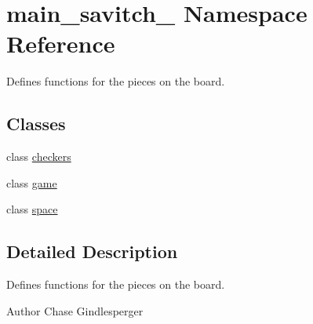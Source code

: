\hypertarget{namespacemain__savitch__14}{}\section{main\+\_\+savitch\+\_ Namespace Reference}
\label{namespacemain__savitch__14}


Defines functions for the pieces on the board.  


\subsection*{Classes}
\begin{DoxyCompactItemize}
\item 
class \hyperlink{classmain__savitch__14_1_1checkers}{checkers}
\item 
class \hyperlink{classmain__savitch__14_1_1game}{game}
\item 
class \hyperlink{classmain__savitch__14_1_1space}{space}
\end{DoxyCompactItemize}


\subsection{Detailed Description}
Defines functions for the pieces on the board. 

\begin{DoxyAuthor}{Author}
Chase Gindlesperger 
\end{DoxyAuthor}

